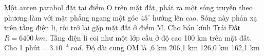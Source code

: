 \begin{vidu}%
Một anten parabol đặt tại điểm O trên mặt đất, phát ra một sóng truyền theo phương làm với mặt phẳng ngang một góc $45^\circ$ hướng lên cao. Sóng này phản xạ trên tầng điện li, rồi trở lại gặp mặt đất ở điểm M. Cho bán kính Trái Đất $R=6400\ km$. Tầng điện li coi như một lớp cầu ở độ cao 100 km trên mặt đất. Cho 1 phút$=3.10^{-4}\ rad$. Độ dài cung OM là
\choice
{,6 km}
{206,1 km}
{126,0 km}
{162,1 km}
\end{vidu}